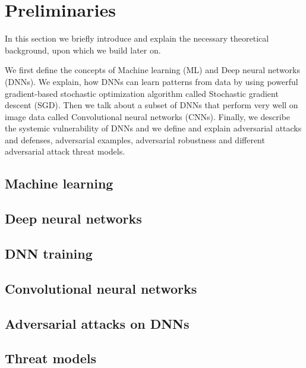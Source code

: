 \chapter{Preliminaries}
\label{preliminaries}

In this section we briefly introduce and explain the necessary theoretical background, upon which we build later on.

We first define the concepts of Machine learning (ML) and Deep neural networks (DNNs). We explain, how DNNs can learn patterns from data by using powerful gradient-based stochastic optimization algorithm called Stochastic gradient descent (SGD). Then we talk about a subset of DNNs that perform very well on image data called Convolutional neural networks (CNNs). Finally, we describe the systemic vulnerability of DNNs and we define and explain adversarial attacks and defenses, adversarial examples, adversarial robustness and different adversarial attack threat models. 


\section{Machine learning}
\cite{Goodfellow-et-al-2016}

\section{Deep neural networks}

\section{DNN training}

\section{Convolutional neural networks}

\section{Adversarial attacks on DNNs}

\section{Threat models}
